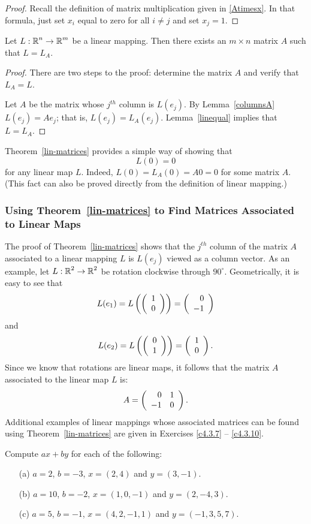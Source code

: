 \documentclass{ximera}
\begin{document}
\begin{proof}  Recall the definition of matrix multiplication given in \eqref{Atimesx}.
In that formula, just set $x_i$ equal to zero for all $i\neq j$ and set
$x_j=1$. \end{proof}

\begin{theorem}  \label{lin-matrices}
Let $L:\mbox{$\Bbb{R}$}^n\to\mbox{$\Bbb{R}$}^m$ be a linear mapping.
Then there exists an $m\times n$ matrix $A$ such that $L=L_A$.
\end{theorem}

\begin{proof}
There are two steps to the proof: determine the matrix $A$ and
verify that $L_A=L$.

Let $A$ be the matrix whose $j^{th}$ column is $L(e_j)$.  By
Lemma~\ref{columnsA} $L(e_j) = Ae_j$; that is, $L(e_j) = L_A(e_j)$.
Lemma~\ref{linequal} implies that $L=L_A$.  \end{proof}

Theorem~\ref{lin-matrices} provides a simple way of showing that
\[
L(0) = 0
\]
for any linear map $L$.  Indeed, $L(0)=L_A(0)=A0=0$ for some matrix $A$.  
(This fact can also be proved directly from the definition of linear mapping.)

\subsubsection*{Using Theorem~\protect\ref{lin-matrices} to Find Matrices
Associated to Linear Maps}

The proof of Theorem~\ref{lin-matrices} shows that the $j^{th}$ column of the
matrix $A$ associated to a linear mapping $L$ is $L(e_j)$ viewed as a column
vector.  As an example, let $L:\mbox{$\Bbb{R}$}^2\to\mbox{$\Bbb{R}$}^2$ be rotation clockwise through
$90^\circ$.  Geometrically, it is easy to see that
\[
  L(e_1) = L\left(\left(\begin{array}{r} 1 \\ 0\end{array}\right)\right) = \left(\begin{array}{r} 0 \\ -1\end{array}\right)
\]
and
\[
L(e_2) = L\left(\left(\begin{array}{r} 0 \\ 1\end{array}\right)\right) = \left(\begin{array}{r} 1 \\ 0\end{array}\right).
\]
Since we know that rotations are linear maps, it follows that the matrix
$A$ associated to the linear map $L$ is:
\[
A = \left(\begin{array}{rr} 0 & 1\\ -1 &0\end{array}\right).
\]
Additional examples of linear mappings whose associated matrices can be found
using Theorem~\ref{lin-matrices} are given in Exercises \ref{c4.3.7} --
\ref{c4.3.10}.



\EXER

\TEXER

\begin{exercise} \label{c4.3.1}
Compute $ax+by$ for each of the following:
\begin{itemize}
\item[(a)] $a=2$, $b=-3$, $x=(2,4)$ and $y=(3,-1)$.
\item[(b)] $a=10$, $b=-2$, $x=(1,0,-1)$ and $y=(2,-4,3)$.
\item[(c)] $a=5$, $b=-1$, $x=(4,2,-1,1)$ and $y=(-1,3,5,7)$.
\end{itemize}
\end{exercise}
\end{document}
